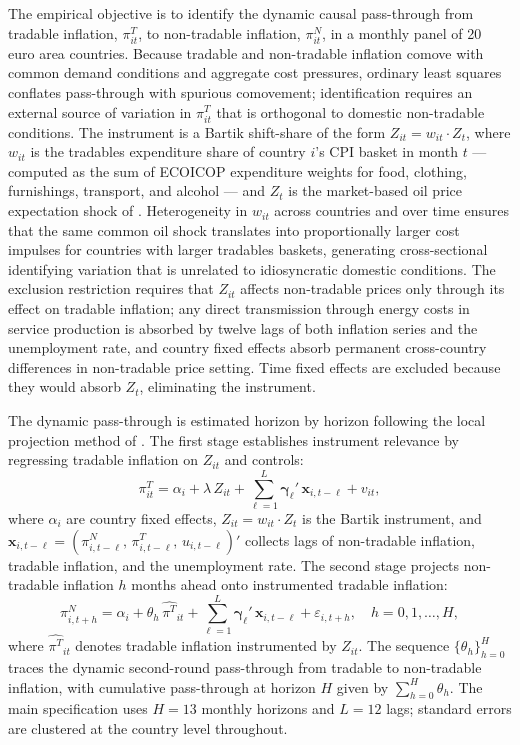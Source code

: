 The empirical objective is to identify the dynamic causal pass-through from tradable
inflation, $\pi^T_{it}$, to non-tradable inflation, $\pi^N_{it}$, in a monthly panel of
20 euro area countries.
Because tradable and non-tradable inflation comove with common demand conditions and
aggregate cost pressures, ordinary least squares conflates pass-through with spurious
comovement; identification requires an external source of variation in $\pi^T_{it}$
that is orthogonal to domestic non-tradable conditions.
The instrument is a Bartik shift-share of the form $Z_{it} = w_{it} \cdot Z_t$, where
$w_{it}$ is the tradables expenditure share of country $i$'s CPI basket in month $t$
--- computed as the sum of ECOICOP expenditure weights for food, clothing, furnishings,
transport, and alcohol --- and $Z_t$ is the market-based oil price expectation shock of
\citet{baumeister2019}.
Heterogeneity in $w_{it}$ across countries and over time ensures that the same common
oil shock translates into proportionally larger cost impulses for countries with larger
tradables baskets, generating cross-sectional identifying variation that is unrelated to
idiosyncratic domestic conditions.
The exclusion restriction requires that $Z_{it}$ affects non-tradable prices only through
its effect on tradable inflation; any direct transmission through energy costs in service
production is absorbed by twelve lags of both inflation series and the unemployment rate,
and country fixed effects absorb permanent cross-country differences in non-tradable price
setting.
Time fixed effects are excluded because they would absorb $Z_t$, eliminating the
instrument.

The dynamic pass-through is estimated horizon by horizon following the local projection
method of \citet{jorda2005}.
The first stage establishes instrument relevance by regressing tradable inflation on $Z_{it}$
and controls:
\begin{equation}
    \pi^T_{it}
    = \alpha_i
    + \lambda\, Z_{it}
    + \sum_{\ell=1}^{L} \boldsymbol{\gamma}_\ell'\, \mathbf{x}_{i,t-\ell}
    + v_{it},
    \label{eq:firststage}
\end{equation}
where $\alpha_i$ are country fixed effects, $Z_{it} = w_{it}\cdot Z_t$ is the
Bartik instrument, and
$\mathbf{x}_{i,t-\ell} = (\pi^N_{i,t-\ell},\,\pi^T_{i,t-\ell},\,u_{i,t-\ell})'$
collects lags of non-tradable inflation, tradable inflation, and the unemployment rate.
The second stage projects non-tradable inflation $h$ months ahead onto instrumented
tradable inflation:
\begin{equation}
    \pi^N_{i,t+h}
    = \alpha_i
    + \theta_h\,\widehat{\pi^T}_{it}
    + \sum_{\ell=1}^{L} \boldsymbol{\gamma}_\ell'\, \mathbf{x}_{i,t-\ell}
    + \varepsilon_{i,t+h},
    \quad h = 0, 1, \ldots, H,
    \label{eq:lpiv}
\end{equation}
where $\widehat{\pi^T}_{it}$ denotes tradable inflation instrumented by $Z_{it}$.
The sequence $\{\theta_h\}_{h=0}^{H}$ traces the dynamic second-round pass-through from
tradable to non-tradable inflation, with cumulative pass-through at horizon $H$ given by
$\sum_{h=0}^{H}\theta_h$.
The main specification uses $H = 13$ monthly horizons and $L = 12$ lags; standard errors
are clustered at the country level throughout.

